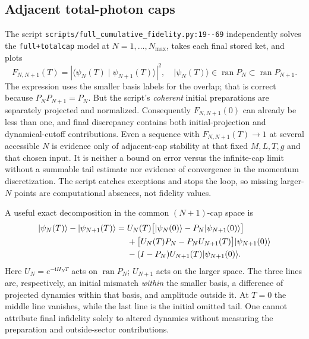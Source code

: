 \documentclass[11pt,a4paper]{article}
\newcommand{\ket}[1]{\lvert #1\rangle}
\newcommand{\braket}[2]{\langle #1\mid #2\rangle}
\newcommand{\code}[1]{\nolinkurl{#1}}
\newcommand{\ii}{\mathrm i}
\begin{document}
\subsection{Adjacent total-photon caps}
The script \code{scripts/full_cumulative_fidelity.py:19--69} independently solves the \code{full+totalcap} model at $N=1,\ldots,N_{\max}$, takes each final stored ket, and plots
\begin{equation}
 F_{N,N+1}(T)=\left|\braket{\psi_{N}(T)}{\psi_{N+1}(T)}\right|^2,
 \quad \ket{\psi_N(T)}\in\operatorname{ran}P_N
 \subset\operatorname{ran}P_{N+1}.
 \label{eq:adjacent}
\end{equation}
The expression uses the smaller basis labels for the overlap; that is correct because $P_NP_{N+1}=P_N$. But the script's \emph{coherent} initial preparations are separately projected and normalized. Consequently $F_{N,N+1}(0)$ can already be less than one, and final discrepancy contains both initial-projection and dynamical-cutoff contributions. Even a sequence with $F_{N,N+1}(T)\to1$ at several accessible $N$ is evidence only of adjacent-cap stability at that fixed $M,L,T,g$ and that chosen input. It is neither a bound on error versus the infinite-cap limit without a summable tail estimate nor evidence of convergence in the momentum discretization. The script catches exceptions and stops the loop, so missing larger-$N$ points are computational absences, not fidelity values.

A useful exact decomposition in the common $(N+1)$-cap space is
\begin{align}
\ket{\psi_N(T)}-\ket{\psi_{N+1}(T)}
={}&U_N(T)\bigl[\ket{\psi_N(0)}-P_N\ket{\psi_{N+1}(0)}\bigr]\notag\\
&+\bigl[U_N(T)P_N-P_NU_{N+1}(T)\bigr]\ket{\psi_{N+1}(0)}\notag\\
&-(I-P_N)U_{N+1}(T)\ket{\psi_{N+1}(0)}.
\label{eq:decomp}
\end{align}
Here $U_N=e^{-\ii H_NT}$ acts on $\operatorname{ran}P_N$; $U_{N+1}$ acts on the larger space. The three lines are, respectively, an initial mismatch \emph{within} the smaller basis, a difference of projected dynamics within that basis, and amplitude outside it. At $T=0$ the middle line vanishes, while the last line is the initial omitted tail. One cannot attribute final infidelity solely to altered dynamics without measuring the preparation and outside-sector contributions.
\end{document}
